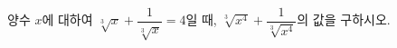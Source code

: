 양수 $x$에 대하여 $\sqrt[3]{x}+\dfrac{1}{\sqrt[3]{x}}=4$일 때, $\sqrt[3]{x^4}+\dfrac{1}{\sqrt[3]{x^4}}$의 값을 구하시오.

